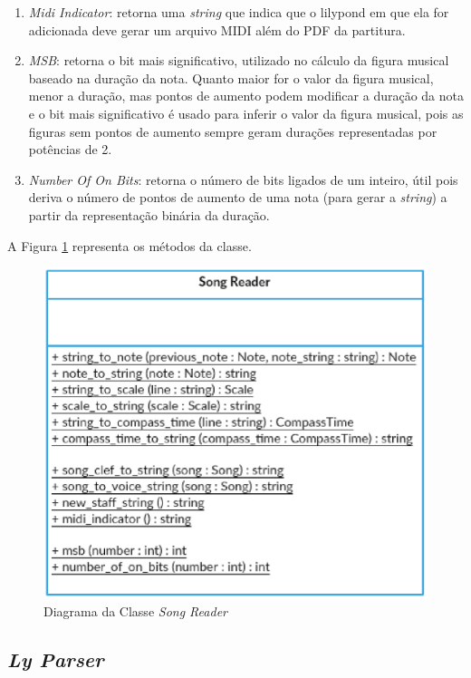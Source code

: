 \begin{enumerate}
        \item \textit{Midi Indicator}: retorna uma \textit{string} que indica que o lilypond em que ela for adicionada deve gerar um arquivo MIDI além do PDF da partitura.
        \item \textit{MSB}: retorna o bit mais significativo, utilizado no cálculo da figura musical baseado na duração da nota. Quanto maior for o valor da figura musical, menor a duração, mas pontos de aumento podem modificar a duração da nota e o bit mais significativo é usado para inferir o valor da figura musical, pois as figuras sem pontos de aumento sempre geram durações representadas por potências de 2.
        \item \textit{Number Of On Bits}: retorna o número de bits ligados de um inteiro, útil pois deriva o número de pontos de aumento de uma nota (para gerar a \textit{string}) a partir da representação binária da duração.
      \end{enumerate}

      A Figura \ref{songreaderclass} representa os métodos da classe.

      \begin{figure}[htb]
        \centering
        \includegraphics[scale=0.8]{figuras/songreaderclass.eps}
        \caption{Diagrama da Classe \textit{Song Reader}}
        \label{songreaderclass}
      \end{figure}

    \subsection[\textit{Ly Parser}]{\textit{Ly Parser}}


